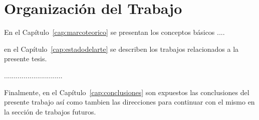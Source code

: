 \section{Organización del Trabajo}
\label{sec:organizaciondeltrabajo}
En el Capítulo~\ref{cap:marcoteorico} se presentan los conceptos básicos ....

en el Capítulo~\ref{cap:estadodelarte} se describen los trabajos relacionados a la presente tesis.

..............................

Finalmente, en el Capítulo~\ref{cap:conclusiones} son expuestos las conclusiones del presente trabajo así como 
tambien las direcciones para continuar con el mismo en la sección de trabajos futuros.



